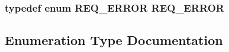 \subsubsection[{\texorpdfstring{R\+E\+Q\+\_\+\+E\+R\+R\+OR}{REQ_ERROR}}]{\setlength{\rightskip}{0pt plus 5cm}typedef enum {\bf R\+E\+Q\+\_\+\+E\+R\+R\+OR} {\bf R\+E\+Q\+\_\+\+E\+R\+R\+OR}}\hypertarget{hs-helper_8h_ab0d62ccfa9c3ab87f090f67c3d50adce}{}\label{hs-helper_8h_ab0d62ccfa9c3ab87f090f67c3d50adce}


\subsection{Enumeration Type Documentation}
